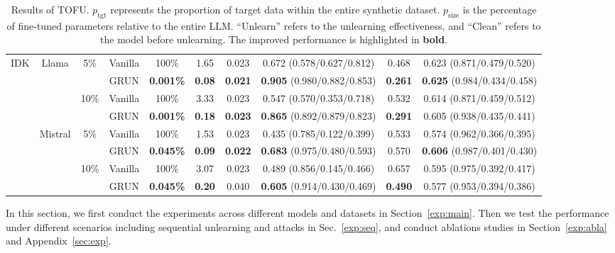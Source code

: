 \begin{table*}[t]
{\begin{tabular}{lccccc|cc|cc}
        \multirow{8}{*}{IDK} & \multirow{4}{*}{Llama} & \multirow{2}{*}{5\%} & Vanilla & 100\% & 1.65 & 0.023 & 0.672  {\small(0.578/0.627/0.812)} & 0.468 & 0.623  {\small(0.871/0.479/0.520)} \\ 
        & ~ & ~ & GRUN & \textbf{0.001\%} & \textbf{0.08} & \textbf{0.021} & \textbf{0.905}  {\small(0.980/0.882/0.853)} & \textbf{0.261} & \textbf{0.625}  {\small(0.984/0.434/0.458)} \\
        & ~ & \multirow{2}{*}{10\%} & Vanilla & 100\% & 3.33 & 0.023 & 0.547  {\small(0.570/0.353/0.718)} & 0.532 & 0.614  {\small(0.871/0.459/0.512)} \\ 
        & ~ & ~ & GRUN & \textbf{0.001\%} & \textbf{0.18} & \textbf{0.023} & \textbf{0.865}  {\small(0.892/0.879/0.823)} & \textbf{0.291} & 0.605  {\small(0.938/0.435/0.441)} \\ \cmidrule(lr){2-10}
        
        & \multirow{4}{*}{Mistral} & \multirow{2}{*}{5\%} & Vanilla & 100\% & 1.53 & 0.023 & 0.435  {\small(0.785/0.122/0.399)} & 0.533 & 0.574  {\small(0.962/0.366/0.395)} \\ 
        & ~ & ~ & GRUN & \textbf{0.045\%} &\textbf{0.09} & \textbf{0.022} & \textbf{0.683}  {\small(0.975/0.480/0.593)} & {0.570} & \textbf{0.606}  {\small(0.987/0.401/0.430)} \\
        & ~ & \multirow{2}{*}{10\%} & Vanilla & 100\% & 3.07 & 0.023 & 0.489  {\small(0.856/0.145/0.466)} & 0.657 & 0.595  {\small(0.975/0.392/0.417)} \\ 
        & ~ & ~ & GRUN & \textbf{0.045\%} &\textbf{0.20} & {0.040} & \textbf{0.605}  {\small(0.914/0.430/0.469)} & \textbf{0.490} & 0.577  {\small(0.953/0.394/0.386)} \\ \bottomrule
    \end{tabular}
    }
    \caption{Results of TOFU. $p_{\text{tgt}}$ represents the proportion of target data within the entire synthetic dataset. $p_{\text{size}}$ is the percentage of fine-tuned parameters relative to the entire LLM. ``Unlearn'' refers to the unlearning effectiveness, and ``Clean'' refers to the model before unlearning. The {improved} performance is highlighted in \textbf{bold}.}
  \label{tab:tofu}
  \vspace{-0.2in}
\end{table*}

In this section, we first conduct the experiments across different models and {datasets} in Section~\ref{exp:main}. Then we test the performance under different scenarios including sequential unlearning and attacks in Sec.~\ref{exp:seq}, and conduct ablations studies in Section~\ref{exp:abla} and Appendix~\ref{sec:exp}. 

